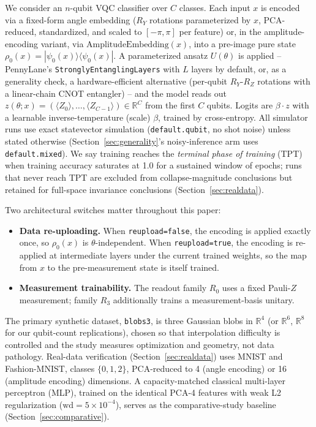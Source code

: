 \documentclass[pdflatex,sn-mathphys-ay]{sn-jnl}
\theoremstyle{thmstyleone}
\theoremstyle{thmstyletwo}
\begin{document}
We consider an $n$-qubit VQC classifier over $C$ classes. Each input $x$ is encoded via a fixed-form angle embedding ($R_Y$ rotations parameterized by $x$, PCA-reduced, standardized, and scaled to $[-\pi,\pi]$ per feature) or, in the amplitude-encoding variant, via $\mathrm{AmplitudeEmbedding}(x)$, into a pre-image pure state $\rho_0(x) = |\psi_0(x)\rangle\!\langle\psi_0(x)|$. A parameterized ansatz $U(\theta)$ is applied -- PennyLane's \texttt{StronglyEntanglingLayers} with $L$ layers by default, or, as a generality check, a hardware-efficient alternative (per-qubit $R_Y$-$R_Z$ rotations with a linear-chain CNOT entangler) -- and the model reads out $z(\theta;x) = (\langle Z_0\rangle,\ldots,\langle Z_{C-1}\rangle) \in \mathbb{R}^C$ from the first $C$ qubits. Logits are $\beta\cdot z$ with a learnable inverse-temperature (scale) $\beta$, trained by cross-entropy. All simulator runs use exact statevector simulation (\texttt{default.qubit}, no shot noise) unless stated otherwise (Section~\ref{sec:generality}'s noisy-inference arm uses \texttt{default.mixed}). We say training reaches the \emph{terminal phase of training} (TPT) when training accuracy saturates at 1.0 for a sustained window of epochs; runs that never reach TPT are excluded from collapse-magnitude conclusions but retained for full-space invariance conclusions (Section~\ref{sec:realdata}).

Two architectural switches matter throughout this paper:
\begin{itemize}
\item \textbf{Data re-uploading.} When \texttt{reupload=false}, the encoding is applied exactly once, so $\rho_0(x)$ is $\theta$-independent. When \texttt{reupload=true}, the encoding is re-applied at intermediate layers under the current trained weights, so the map from $x$ to the pre-measurement state is itself trained.
\item \textbf{Measurement trainability.} The readout family $R_0$ uses a fixed Pauli-$Z$ measurement; family $R_3$ additionally trains a measurement-basis unitary.
\end{itemize}

The primary synthetic dataset, \texttt{blobs3}, is three Gaussian blobs in $\mathbb{R}^4$ (or $\mathbb{R}^6$, $\mathbb{R}^8$ for our qubit-count replications), chosen so that interpolation difficulty is controlled and the study measures optimization and geometry, not data pathology. Real-data verification (Section~\ref{sec:realdata}) uses MNIST and Fashion-MNIST, classes $\{0,1,2\}$, PCA-reduced to 4 (angle encoding) or 16 (amplitude encoding) dimensions. A capacity-matched classical multi-layer perceptron (MLP), trained on the identical PCA-4 features with weak L2 regularization ($\mathrm{wd}=5\times10^{-4}$), serves as the comparative-study baseline (Section~\ref{sec:comparative}).
\end{document}
